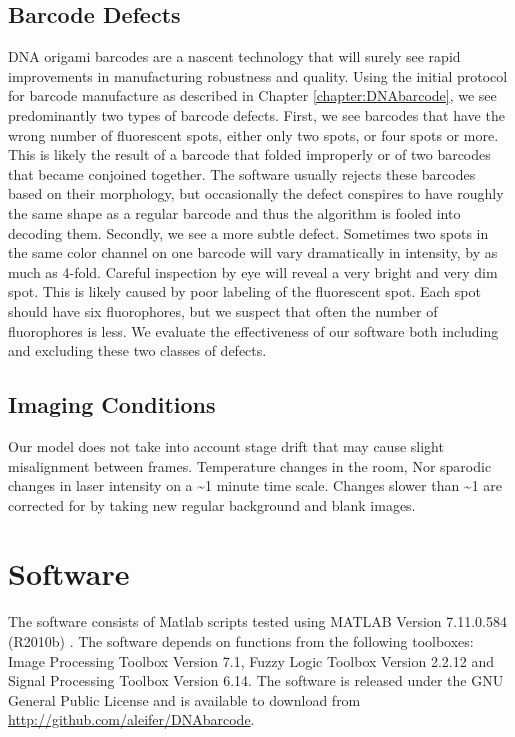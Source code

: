 \subsection{Barcode Defects}
DNA origami barcodes are a nascent technology that will surely see rapid improvements in manufacturing robustness and quality. Using the initial protocol for barcode manufacture as described in Chapter \ref{chapter:DNAbarcode}, we see predominantly two types of barcode defects. First, we see barcodes that have the wrong number of fluorescent spots, either only two spots, or four spots or more. This is likely the result of a barcode that folded improperly or of two barcodes that became conjoined together. The software usually rejects these barcodes based on their morphology, but occasionally the defect conspires to have roughly the same shape as a regular barcode and thus the algorithm is fooled into decoding them. Secondly, we see a more subtle defect. Sometimes two spots in the same color channel on one barcode will vary dramatically in intensity, by as much as 4-fold. Careful inspection by eye will reveal a very bright and very dim spot. This is likely caused by poor labeling of the fluorescent spot. Each spot should have six fluorophores, but we suspect that often the number of fluorophores is less. We evaluate the effectiveness of our software both including and excluding these two classes of defects.    


\subsection{Imaging Conditions}
Our model does not take into account stage drift that may cause slight misalignment between frames. 
Temperature changes in the room, Nor sparodic changes in laser intensity on a \textasciitilde1 minute time scale. Changes slower than \textasciitilde1 are corrected for by taking new regular background and blank images.
 
\section{Software}
The software consists of Matlab scripts tested using MATLAB Version 7.11.0.584 (R2010b) \citep{matlab_version_2010}. The software depends on functions from the following toolboxes: Image Processing Toolbox Version 7.1, Fuzzy Logic Toolbox Version 2.2.12 and Signal Processing Toolbox Version 6.14. The software is released under the GNU General Public License and is available to download from \url{http://github.com/aleifer/DNAbarcode}.

